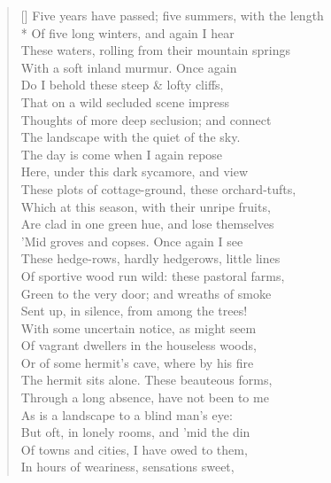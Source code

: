 \documentclass[MAIN]{subfiles}
\begin{document}
\settowidth{\versewidth}{Five years have passed; five summers, with the length}
\begin{verse}[\versewidth]
Five years have passed; five summers, with the length\\* 
Of five long winters, and again I hear\\
These waters, rolling from their mountain springs\\
With a soft inland murmur. Once again\\
Do I behold these steep \& lofty cliffs,\\
That on a wild secluded scene impress\\
Thoughts of more deep seclusion; and connect\\
The landscape with the quiet of the sky.\\
The day is come when I again repose\\
Here, under this dark sycamore, and view\\
These plots of cottage-ground, these orchard-tufts,\\
Which at this season, with their unripe fruits,\\
Are clad in one green hue, and lose themselves\\
'Mid groves and copses. Once again I see\\
These hedge-rows, hardly hedgerows, little lines\\
Of sportive wood run wild: these pastoral farms,\\
Green to the very door; and wreaths of smoke\\
Sent up, in silence, from among the trees!\\
With some uncertain notice, as might seem\\
Of vagrant dwellers in the houseless woods,\\ 
Or of some hermit's cave, where by his fire\\
The hermit sits alone. These beauteous forms,\\ 
Through a long absence, have not been to me\\
As is a landscape to a blind man's eye:\\
But oft, in lonely rooms, and 'mid the din\\ 
Of towns and cities, I have owed to them,\\
In hours of weariness, sensations sweet,\\

\end{verse}
\end{document}
